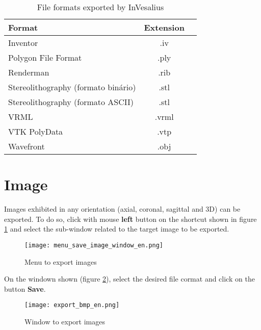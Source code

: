 \begin{table}[h]
\centering
\caption{File formats exported by InVesalius}
\begin{tabular}{lcc}\\
\hline %
Format & Extension\\
\hline
\hline
Inventor & .iv\\
Polygon File Format & .ply\\
Renderman & .rib\\
Stereolithography (formato binário)& .stl\\
Stereolithography (formato ASCII) & .stl\\
VRML & .vrml\\
VTK PolyData & .vtp\\
Wavefront & .obj\\
\hline
\end{tabular}
\label{tab:files_export_list}
\end{table} 


\section{Image}

Images exhibited in any orientation (axial, coronal,
sagittal and 3D) can be exported. To do so, click with mouse \textbf{left} button on the shortcut
shown in figure \ref{fig:menu_save_image_window} and select the sub-window related to the target
image to be exported.

\begin{figure}[!htb]
\centering
\texttt{[image: menu\_save\_image\_window\_en.png]}
\caption{Menu to export images}
\label{fig:menu_save_image_window}
\end{figure}

On the windown shown (figure \ref{fig:save_image_window}), select the desired file cormat and click
on the button \textbf{Save}.

\begin{figure}[!htb]
\centering
\texttt{[image: export\_bmp\_en.png]}
\caption{Window to export images}
\label{fig:save_image_window}
\end{figure}
